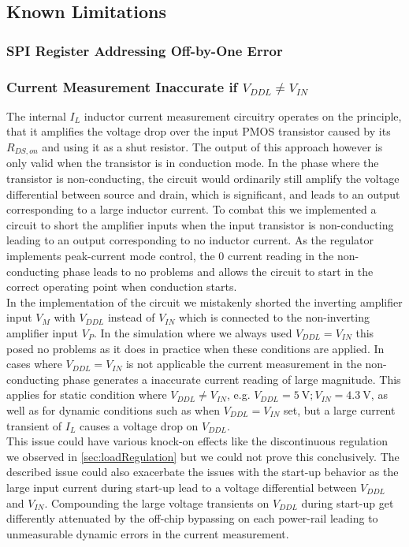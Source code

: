 \subsection{Known Limitations}

\subsubsection{SPI Register Addressing Off-by-One Error}

\subsubsection{Current Measurement Inaccurate if $V_{DDL} \neq V_{IN}$}
\label{subsubsec:cur_mes_inac}
The internal $I_L$ inductor current measurement circuitry operates on the principle, that it amplifies the voltage drop over the input PMOS transistor caused by its $R_{DS,on}$ and using it as a shut resistor. The output of this approach however is only valid when the transistor is in conduction mode. In the phase where the transistor is non-conducting, the circuit would ordinarily still amplify the voltage differential between source and drain, which is significant, and leads to an output corresponding to a large inductor current. To combat this we implemented a circuit to short the amplifier inputs when the input transistor is non-conducting leading to an output corresponding to no inductor current. As the regulator implements peak-current mode control, the 0 current reading in the non-conducting phase leads to no problems and allows the circuit to start in the correct operating point when conduction starts. \\
In the implementation of the circuit we mistakenly shorted the inverting amplifier input $V_M$ with $V_{DDL}$ instead of $V_{IN}$ which is connected to the non-inverting amplifier input $V_P$. In the simulation where we always used $V_{DDL} = V_{IN}$ this posed no problems as it does in practice when these conditions are applied. In cases where $V_{DDL} = V_{IN}$ is not applicable the current measurement in the non-conducting phase generates a inaccurate current reading of large magnitude. This applies for static condition where $V_{DDL} \neq V_{IN}$, e.g. $V_{DDL} = \qty{5}{\volt}; V_{IN}= \qty{4.3}{\volt}$, as well as for dynamic conditions such as when $V_{DDL} = V_{IN}$ set, but a large current transient of $I_L$ causes a voltage drop on $V_{DDL}$.\\
This issue could have various knock-on effects like the discontinuous regulation we observed in \autoref{sec:loadRegulation} but we could not prove this conclusively. The described issue could also exacerbate the issues with the start-up behavior as the large input current during start-up lead to a voltage differential between $V_{DDL}$ and $V_{IN}$. Compounding the large voltage transients on $V_{DDL}$ during start-up get differently attenuated by the off-chip bypassing on each power-rail leading to unmeasurable dynamic errors in the current measurement.

